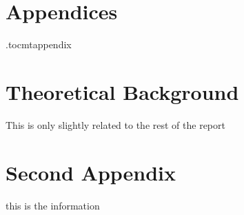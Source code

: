 \newpage
\section*{Appendices}
\appendix
\newpage
\etocdepthtag.toc{mtappendix}
\tableofcontents
\newpage


\section{Theoretical Background}
This is only slightly related to the rest of the report


\section{Second Appendix}
this is the information

